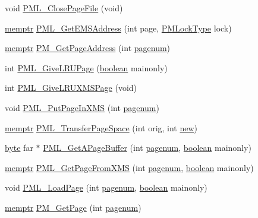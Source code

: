 \begin{DoxyCompactItemize}
void \hyperlink{ID__PM_8C_a5a2578fa944d0908a0d43e7f362036cb}{PML\_\-ClosePageFile} (void)
\item 
\hyperlink{ID__MM_8H_a04062decc7eb282b066c65e9137bb9bf}{memptr} \hyperlink{ID__PM_8C_aa4215b4363055b96b571bedb294d39a2}{PML\_\-GetEMSAddress} (int page, \hyperlink{ID__PM_8H_a470960f2645467be319a542ef1f65851}{PMLockType} lock)
\item 
\hyperlink{ID__MM_8H_a04062decc7eb282b066c65e9137bb9bf}{memptr} \hyperlink{ID__PM_8C_a6d8376b84fdfd88c991b82d9d9cebcfd}{PM\_\-GetPageAddress} (int \hyperlink{WL__TEXT_8C_ad303d1f16fd753775f930d896512b75b}{pagenum})
\item 
int \hyperlink{ID__PM_8C_a1a23d717675f8d14bd6e07bb7bcbd4b4}{PML\_\-GiveLRUPage} (\hyperlink{ID__HEAD_8H_a7c6368b321bd9acd0149b030bb8275ed}{boolean} mainonly)
\item 
int \hyperlink{ID__PM_8C_aa3210f7fc8e7367f2349cd17cbec0c67}{PML\_\-GiveLRUXMSPage} (void)
\item 
void \hyperlink{ID__PM_8C_a0b6f9ec457913559bcff1d9258a15552}{PML\_\-PutPageInXMS} (int \hyperlink{WL__TEXT_8C_ad303d1f16fd753775f930d896512b75b}{pagenum})
\item 
\hyperlink{ID__MM_8H_a04062decc7eb282b066c65e9137bb9bf}{memptr} \hyperlink{ID__PM_8C_aa2abd895c0ac117de4d033b6850a9a07}{PML\_\-TransferPageSpace} (int orig, int \hyperlink{WL__PLAY_8C_aeef0824257f536812a114a0e932b654f}{new})
\item 
\hyperlink{ID__HEAD_8H_a0c8186d9b9b7880309c27230bbb5e69d}{byte} far $\ast$ \hyperlink{ID__PM_8C_a4694a0931f68c73c15c7cdd4b6a4cb61}{PML\_\-GetAPageBuffer} (int \hyperlink{WL__TEXT_8C_ad303d1f16fd753775f930d896512b75b}{pagenum}, \hyperlink{ID__HEAD_8H_a7c6368b321bd9acd0149b030bb8275ed}{boolean} mainonly)
\item 
\hyperlink{ID__MM_8H_a04062decc7eb282b066c65e9137bb9bf}{memptr} \hyperlink{ID__PM_8C_a15cc7513b41c134b24cd20536a63f892}{PML\_\-GetPageFromXMS} (int \hyperlink{WL__TEXT_8C_ad303d1f16fd753775f930d896512b75b}{pagenum}, \hyperlink{ID__HEAD_8H_a7c6368b321bd9acd0149b030bb8275ed}{boolean} mainonly)
\item 
void \hyperlink{ID__PM_8C_a14156f3e9e18532f92f4c00e761fa0b7}{PML\_\-LoadPage} (int \hyperlink{WL__TEXT_8C_ad303d1f16fd753775f930d896512b75b}{pagenum}, \hyperlink{ID__HEAD_8H_a7c6368b321bd9acd0149b030bb8275ed}{boolean} mainonly)
\item 
\hyperlink{ID__MM_8H_a04062decc7eb282b066c65e9137bb9bf}{memptr} \hyperlink{ID__PM_8C_a80f33d5bd3e0a9a388063a78edf53329}{PM\_\-GetPage} (int \hyperlink{WL__TEXT_8C_ad303d1f16fd753775f930d896512b75b}{pagenum})

\end{DoxyCompactItemize}
